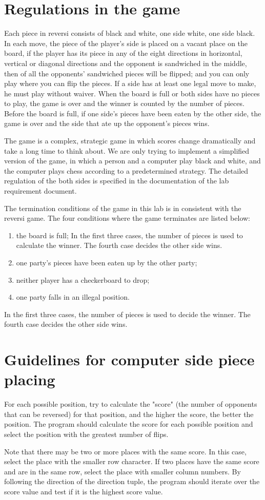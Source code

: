 \documentclass[a4paper]{report}
\begin{document}
\section{Regulations in the game}
Each piece in reversi consists of black and white, one side white, one side black. In each move, the piece of the player's side is placed on a vacant place on the board, if the player has its piece in any of the eight directions in horizontal, vertical or diagonal directions and the opponent is sandwiched in the middle, then of all the opponents' sandwiched pieces will be flipped; and you can only play where you can flip the pieces. If a side has at least one legal move to make, he must play without waiver. When the board is full or both sides have no pieces to play, the game is over and the winner is counted by the number of pieces. Before the board is full, if one side's pieces have been eaten by the other side, the game is over and the side that ate up the opponent's pieces wins. 
\par
The game is a complex, strategic game in which scores change dramatically and take a long time to think about. We are only trying to implement a simplified version of the game, in which a person and a computer play black and white, and the computer plays chess according to a predetermined strategy. The detailed regulation of the both sides is specified in the  documentation of the lab requirement document.
\par
The termination conditions of the game in this lab is in consistent with the reversi game. The four conditions where the game terminates are listed below:

\begin{enumerate}
\item the board is full; In the first three cases, the number of pieces is used to calculate the winner. The fourth case decides the other side wins.
\item one party's pieces have been eaten up by the other party; 
\item neither player has a checkerboard to drop;
\item one party falls in an illegal position.
\end{enumerate}
In the first three cases, the number of pieces is used to decide the winner. The fourth case decides the other side wins.
\section{Guidelines for computer side piece placing}
For each possible position, try to calculate the "score" (the number of opponents that can be reversed) for that position, and the higher the score, the better the position. The program should calculate the score for each possible position and select the position with the greatest number of flips. 
\par
Note that there may be two or more places with the same score. In this case, select the place with the smaller row character. If two places have the same score and are in the same row, select the place with smaller column numbers. By following the direction of the direction tuple, the program should iterate over the score value and test if it is the highest score value.
\end{document}
